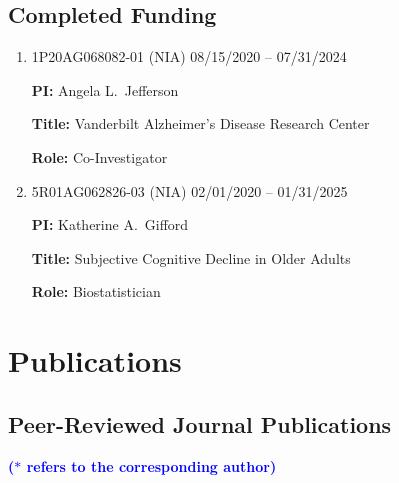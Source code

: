 \documentclass[12pt]{article}
\begin{document}
	\subsection*{Completed Funding}
	\begin{enumerate}		
		\item 1P20AG068082-01 (NIA) \hfill 08/15/2020 -- 
		07/31/2024
		
		{\bf PI:} Angela L.\ Jefferson
		
		{\bf Title:} Vanderbilt Alzheimer's Disease Research Center
		
		{\bf Role:} Co-Investigator
		
		\item 5R01AG062826-03 (NIA) \hfill 02/01/2020 -- 01/31/2025
		
		{\bf PI:} Katherine A.\ Gifford
		
		{\bf Title:} Subjective Cognitive Decline in Older Adults
		
		{\bf Role:} Biostatistician
	\end{enumerate}

	
	\section*{Publications}
	\subsection*{Peer-Reviewed Journal Publications}
	
	{\bf \textcolor{blue}{($\ast$ refers to the corresponding author)}}
	
	\noindent {\bf \textcolor{oak}{($\dagger$ refers to my 
	students, postdocs or trainees)}}
	
\end{document}
